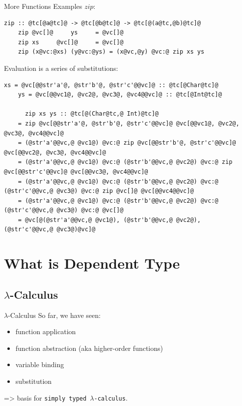 \documentclass[xcolor={usenames,dvipsnames}]{beamer}
\begin{document}
\begin{frame}[fragile]{More Functions Examples}
  $zip$:
  \begin{lstlisting}[style=hask]
    zip :: @tc[@a@tc]@ -> @tc[@b@tc]@ -> @tc[@(a@tc,@b)@tc]@
    zip @vc[]@     ys     = @vc[]@
    zip xs     @vc[]@     = @vc[]@
    zip (x@vc:@xs) (y@vc:@ys) = (x@vc,@y) @vc:@ zip xs ys
  \end{lstlisting}

  Evaluation is a series of substitutions:
  \begin{lstlisting}[style=hask]
    xs = @vc[@@str'a'@, @str'b'@, @str'c'@@vc]@ :: @tc[@Char@tc]@
    ys = @vc[@@vc1@, @vc2@, @vc3@, @vc4@@vc]@ :: @tc[@Int@tc]@

      zip xs ys :: @tc[@(Char@tc,@ Int)@tc]@
    = zip @vc[@@str'a'@, @str'b'@, @str'c'@@vc]@ @vc[@@vc1@, @vc2@, @vc3@, @vc4@@vc]@
    = (@str'a'@@vc,@ @vc1@) @vc:@ zip @vc[@@str'b'@, @str'c'@@vc]@ @vc[@@vc2@, @vc3@, @vc4@@vc]@
    = (@str'a'@@vc,@ @vc1@) @vc:@ (@str'b'@@vc,@ @vc2@) @vc:@ zip @vc[@@str'c'@@vc]@ @vc[@@vc3@, @vc4@@vc]@
    = (@str'a'@@vc,@ @vc1@) @vc:@ (@str'b'@@vc,@ @vc2@) @vc:@ (@str'c'@@vc,@ @vc3@) @vc:@ zip @vc[]@ @vc[@@vc4@@vc]@
    = (@str'a'@@vc,@ @vc1@) @vc:@ (@str'b'@@vc,@ @vc2@) @vc:@ (@str'c'@@vc,@ @vc3@) @vc:@ @vc[]@
    = @vc[@(@str'a'@@vc,@ @vc1@), (@str'b'@@vc,@ @vc2@), (@str'c'@@vc,@ @vc3@)@vc]@
  \end{lstlisting}
\end{frame}


\section{What is Dependent Type}

\subsection{$\lambda$-Calculus}

\begin{frame}[fragile]{$\lambda$-Calculus}
  So far, we have seen:
  \begin{itemize}
    \item function application
    \item function abstraction {\tiny(aka higher-order functions)}
    \item variable binding
    \item substitution
  \end{itemize}
  => basis for \texttt{simply typed $\lambda$-calculus}.
\end{frame}
\end{document}
